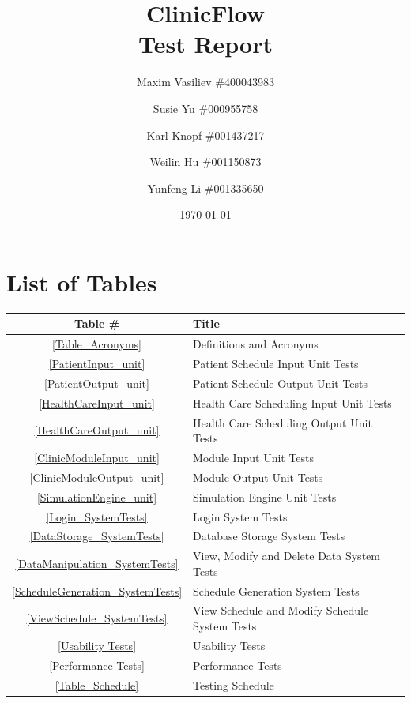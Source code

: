 \documentclass[12pt]{article}
\title{
ClinicFlow
\\\vspace{10mm}
\Large \textbf{Test Report}
\vspace{40mm}
}
\author{ Maxim Vasiliev \#400043983
\and
Susie Yu \#000955758
\and
Karl Knopf \#001437217
\and
Weilin Hu \#001150873
\and
Yunfeng Li \#001335650
}
\date{\today}
\begin{document}
\maketitle
\newpage
\tableofcontents
\newpage
{}
\setlength\parindent{0pt}

\section*{List of Tables}

\begin{center}
\begin{tabular}{cl}
\toprule

\bf Table \# & \bf Title\\\midrule

\ref{Table_Acronyms} & Definitions and Acronyms\\
\ref{PatientInput_unit} & Patient Schedule Input Unit Tests \\
\ref{PatientOutput_unit} & Patient Schedule Output Unit Tests \\
\ref{HealthCareInput_unit}& Health Care Scheduling Input Unit Tests\\
\ref{HealthCareOutput_unit}& Health Care Scheduling Output Unit Tests \\
\ref{ClinicModuleInput_unit}& Module Input Unit Tests \\
\ref{ClinicModuleOutput_unit} &Module Output Unit Tests \\
\ref{SimulationEngine_unit} & Simulation Engine Unit Tests \\

\ref{Login_SystemTests} & Login System Tests \\
\ref{DataStorage_SystemTests} & Database Storage System Tests \\
\ref{DataManipulation_SystemTests} & View, Modify and Delete Data System Tests \\
\ref{ScheduleGeneration_SystemTests} & Schedule Generation System Tests \\
\ref{ViewSchedule_SystemTests} & View Schedule and Modify Schedule System Tests \\
\ref{Usability Tests} & Usability Tests \\
\ref{Performance Tests} & Performance Tests \\
\ref{Table_Schedule} & Testing Schedule \\
\bottomrule
\end{tabular}
\end{center}
\end{document}
